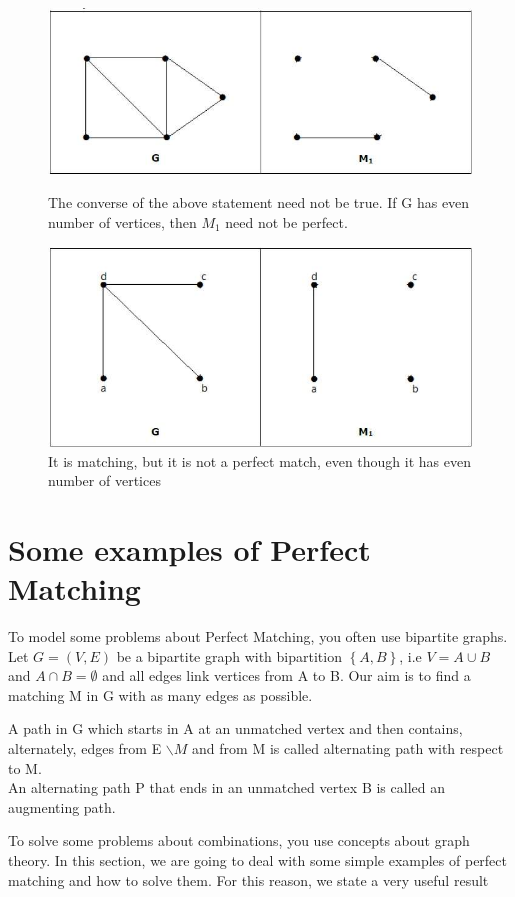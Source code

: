 \begin{figure}[htbp]
\begin{minipage}[htbp]{.80\textwidth}
\centering
\includegraphics[width=.60\textwidth]{matching1.png}
\caption{The converse of the above statement need not be true. If G has even number of vertices, then $M_{1}$ need not be perfect.}
\end{minipage}
\begin{minipage}[htbp]{.80\textwidth}
\centering
\includegraphics[width=.60\textwidth]{matching2.png}
\caption{It is matching, but it is not a perfect match, even though it has even number of vertices}
\end{minipage}
\end{figure}

\section{Some examples of Perfect Matching}
To model some problems about Perfect Matching, you often use bipartite graphs. Let $G = (V,E)$ be a bipartite graph with bipartition $\left \{A,B \right \}$, i.e $V = A \cup B$ and $A \cap B = \emptyset$ and all edges link vertices from A to B. Our aim is to find a matching M in G with as many edges as possible.

\begin{definition}
A path in G which starts in A at an unmatched vertex and then contains, alternately, edges from E $\smallsetminus M$ and from M is called alternating path with respect to M.\\
An alternating path P that ends in an unmatched vertex B is called an augmenting path.
\end{definition}
To solve some problems about combinations, you use concepts about graph theory. In this section, we are going to deal with some simple examples of perfect matching and how to solve them. For this reason, we state a very useful result

